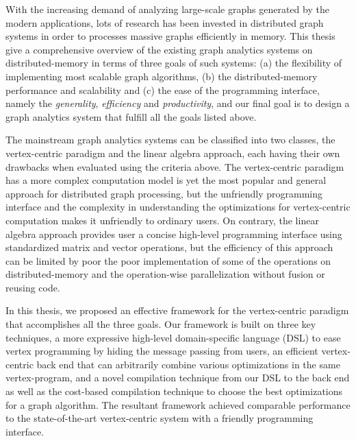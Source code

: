 \documentclass{sokendai_thesis} %
\begin{document}
With the increasing demand of analyzing large-scale graphs generated by the modern applications, lots of research has been invested in distributed graph systems in order to processes massive graphs efficiently in memory.
This thesis give a comprehensive overview of the existing graph analytics systems on distributed-memory in terms of three goals of such systems: (a) the flexibility of implementing most scalable graph algorithms, (b) the distributed-memory performance and scalability and (c) the ease of the programming interface, namely the \emph{generality}, \emph{efficiency} and \emph{productivity}, and our final goal is to design a graph analytics system that fulfill all the goals listed above.


The mainstream graph analytics systems can be classified into two classes, the vertex-centric paradigm and the linear algebra approach, each having their own drawbacks when evaluated using the criteria above.
The vertex-centric paradigm has a more complex computation model is yet the most popular and general approach for distributed graph processing, but the unfriendly programming interface and the complexity in understanding the optimizations for vertex-centric computation makes it unfriendly to ordinary users.
On contrary, the linear algebra approach provides user a concise high-level programming interface using standardized matrix and vector operations, but the efficiency of this approach can be limited by poor the poor implementation of some of the operations on distributed-memory and the operation-wise parallelization without fusion or reusing code.

In this thesis, we proposed an effective framework for the vertex-centric paradigm that accomplishes all the three goals.
Our framework is built on three key techniques, a more expressive high-level domain-specific language (DSL) to ease vertex programming by hiding the message passing from users, an efficient vertex-centric back end that can arbitrarily combine various optimizations in the same vertex-program, and a novel compilation technique from our DSL to the back end as well as the cost-based compilation technique to choose the best optimizations for a graph algorithm.
The resultant framework achieved comparable performance to the state-of-the-art vertex-centric system with a friendly programming interface.
\end{document}

